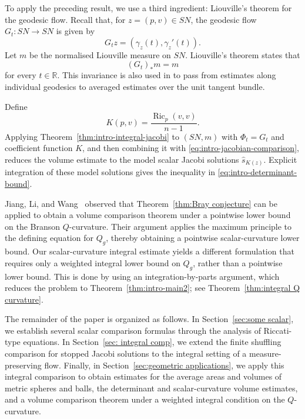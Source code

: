 \documentclass[11pt, reqno]{amsart}
\begin{document}
To apply the preceding result, we use a third ingredient: Liouville's theorem for the geodesic flow. Recall that, for $z=(p, v)\in SN$, the geodesic flow $G_t\colon SN\to SN$ is given by
$$
G_tz=\left(\gamma_z(t), \gamma_z'(t)\right).
$$
Let $m$ be the normalised Liouville measure on $SN$. Liouville's theorem \cite[Corollary~1.31 and Exercise~1.33]{Paternain} states that
$$
(G_t)_*m=m
$$
for every $t\in\mathbb R$. This invariance is also used in \cite{Kwong2025} to pass from estimates along individual geodesics to averaged estimates over the unit tangent bundle.

Define
\begin{equation}\label{eq:K}
K(p, v)=\frac{\operatorname{Ric}_p(v, v)}{n-1}.
\end{equation}
Applying Theorem~\ref{thm:intro-integral-jacobi} to $(SN, m)$ with $\Phi_t=G_t$ and coefficient function $K$, and then combining it with \eqref{eq:intro-jacobian-comparison}, reduces the volume estimate to the model scalar Jacobi solutions $\widehat s_{K(z)}$. Explicit integration of these model solutions gives the inequality in \eqref{eq:intro-determinant-bound}.

Jiang, Li, and Wang~\cite{JiangLiWang} observed that Theorem~\ref{thm:Bray conjecture} can be applied to obtain a volume comparison theorem under a pointwise lower bound on the Branson $Q$-curvature. Their argument applies the maximum principle to the defining equation for $Q_g$, thereby obtaining a pointwise scalar-curvature lower bound. Our scalar-curvature integral estimate yields a different formulation that requires only a weighted integral lower bound on $Q_g$, rather than a pointwise lower bound. This is done by using an integration-by-parts argument, which reduces the problem to Theorem~\ref{thm:intro-main2}; see Theorem~\ref{thm:integral Q curvature}.

The remainder of the paper is organized as follows. In Section~\ref{sec:some scalar}, we establish several scalar comparison formulas through the analysis of Riccati-type equations. In Section~\ref{sec: integral comp}, we extend the finite shuffling comparison for stopped Jacobi solutions to the integral setting of a measure-preserving flow. Finally, in Section~\ref{sec:geometric applications}, we apply this integral comparison to obtain estimates for the average areas and volumes of metric spheres and balls, the determinant and scalar-curvature volume estimates, and a volume comparison theorem under a weighted integral condition on the $Q$-curvature.
\end{document}
